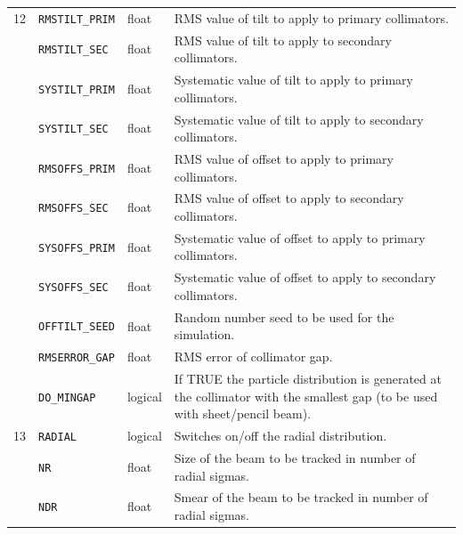 \begin{center}
\begin{longtable}{| p{0.5cm} | p{2.4cm} | p{1.2cm} | >{\raggedright\arraybackslash}p{11.4cm}|}
    12  & \texttt{RMSTILT\_PRIM} & float   & RMS value of tilt to apply to primary collimators\index{primary collimator}. \\
        \cline{2-4}
        & \texttt{RMSTILT\_SEC}  & float   & RMS value of tilt to apply to secondary collimators\index{secondary collimator}. \\
        \cline{2-4}
        & \texttt{SYSTILT\_PRIM} & float   & Systematic value of tilt to apply to primary collimators.\index{primary collimator} \\
        \cline{2-4}
        & \texttt{SYSTILT\_SEC}  & float   & Systematic value of tilt to apply to secondary collimators\index{secondary collimator}. \\
        \cline{2-4}
        & \texttt{RMSOFFS\_PRIM} & float   & RMS value of offset to apply to primary collimators\index{primary collimator}. \\
        \cline{2-4}
        & \texttt{RMSOFFS\_SEC}  & float   & RMS value of offset to apply to secondary collimators\index{secondary collimator}. \\
        \cline{2-4}
        & \texttt{SYSOFFS\_PRIM} & float   & Systematic value of offset to apply to primary collimators\index{primary collimator}. \\
        \cline{2-4}
        & \texttt{SYSOFFS\_SEC}  & float   & Systematic value of offset to apply to secondary collimators\index{secondary collimator}. \\
        \cline{2-4}
        & \texttt{OFFTILT\_SEED} & float   & Random number seed to be used for the simulation. \\
        \cline{2-4}
        & \texttt{RMSERROR\_GAP} & float   & RMS error of collimator gap. \\
        \cline{2-4}
        & \texttt{DO\_MINGAP}    & logical & If TRUE the particle distribution is generated at the collimator with the smallest gap (to be used with sheet/pencil beam). \\
    \hline

    13  & \texttt{RADIAL}        & logical & Switches on/off the radial distribution. \\
        \cline{2-4}
        & \texttt{NR}            & float   & Size of the beam to be tracked in number of radial sigmas. \\
        \cline{2-4}
        & \texttt{NDR}           & float   & Smear of the beam to be tracked in number of radial sigmas. \\
    \hline


\end{longtable}
\end{center}
